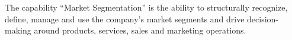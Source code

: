 %
%
The capability \enquote{Market Segmentation} is the ability to structurally recognize, define, manage and use the
company's market segments and drive decision-making around products, services, sales and marketing operations.

